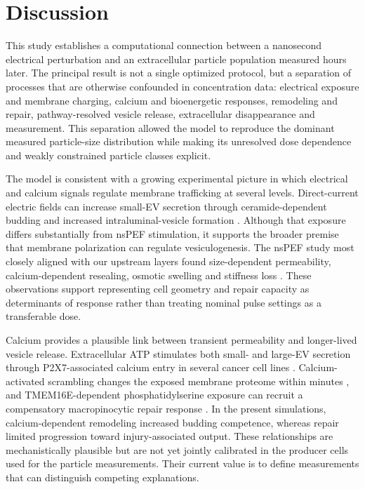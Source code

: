\section*{Discussion}

This study establishes a computational connection between a nanosecond electrical perturbation and an extracellular particle population measured hours later. The principal result is not a single optimized protocol, but a separation of processes that are otherwise confounded in concentration data: electrical exposure and membrane charging, calcium and bioenergetic responses, remodeling and repair, pathway-resolved vesicle release, extracellular disappearance and measurement. This separation allowed the model to reproduce the dominant measured particle-size distribution while making its unresolved dose dependence and weakly constrained particle classes explicit.

The model is consistent with a growing experimental picture in which electrical and calcium signals regulate membrane trafficking at several levels. Direct-current electric fields can increase small-EV secretion through ceramide-dependent budding and increased intraluminal-vesicle formation \cite{huang2026electric}. Although that exposure differs substantially from nsPEF stimulation, it supports the broader premise that membrane polarization can regulate vesiculogenesis. The nsPEF study most closely aligned with our upstream layers found size-dependent permeability, calcium-dependent resealing, osmotic swelling and stiffness loss \cite{kielbik2026selective}. These observations support representing cell geometry and repair capacity as determinants of response rather than treating nominal pulse settings as a transferable dose.

Calcium provides a plausible link between transient permeability and longer-lived vesicle release. Extracellular ATP stimulates both small- and large-EV secretion through P2X7-associated calcium entry in several cancer cell lines \cite{kao2023atp}. Calcium-activated scrambling changes the exposed membrane proteome within minutes \cite{tuomivaara2024slapshot}, and TMEM16E-dependent phosphatidylserine exposure can recruit a compensatory macropinocytic repair response \cite{kim2025tmem16e}. In the present simulations, calcium-dependent remodeling increased budding competence, whereas repair limited progression toward injury-associated output. These relationships are mechanistically plausible but are not yet jointly calibrated in the producer cells used for the particle measurements. Their current value is to define measurements that can distinguish competing explanations.

